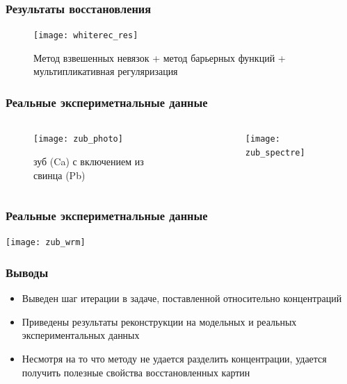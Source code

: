\begin{frame}
\frametitle{Результаты восстановления}
\begin{figure}
\centering
\texttt{[image: whiterec\_res]}
\\
\caption{Метод взвешенных невязок + метод барьерных функций + мультипликативная регуляризация}
\end{figure}
\end{frame}

\begin{frame}
\frametitle{Реальные экспериметнальные данные}
\centering
\vspace{-0.3cm}
\begin{columns}

\begin{column}{0.2\textwidth}
\begin{figure}
    \texttt{[image: zub\_photo]}
    \caption{зуб (Ca) с включением из свинца (Pb)}
\end{figure}
\end{column}

\begin{column}{0.8\textwidth}
\begin{figure}
    \texttt{[image: zub\_spectre]}
\end{figure}
\end{column}
\end{columns}
\end{frame}

\begin{frame}
\frametitle{Реальные экспериметнальные данные}
\texttt{[image: zub\_wrm]}
\end{frame}

\begin{frame}
\frametitle{Выводы}
\begin{itemize}
  \item Выведен шаг итерации в задаче, поставленной относительно концентраций
  \item Приведены результаты реконструкции на модельных и реальных экспериментальных данных
  \item Несмотря на то что методу не удается разделить концентрации, удается получить полезные свойства восстановленных картин
\end{itemize}
\end{frame}